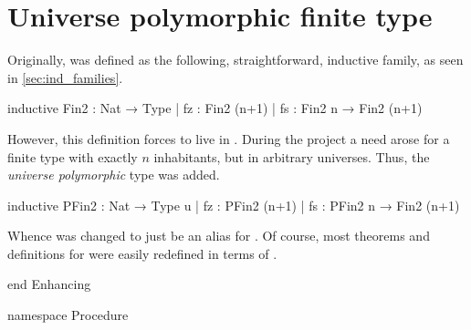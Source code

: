 \section{Universe polymorphic finite type}
\label{sec:enhance:pfin2}
Originally,  was defined as the following, straightforward, inductive family, as seen in \cref{sec:ind_families}.
\begin{leancode}
    inductive Fin2 : Nat → Type
    | fz : Fin2 (n+1)
    | fs : Fin2 n → Fin2 (n+1)
\end{leancode}

However, this definition forces  to live in \Type.
During the project a need arose for a finite type with exactly $n$ inhabitants, but in arbitrary universes. Thus, the \emph{universe polymorphic}  type was added.
\begin{leancode}
    inductive PFin2 : Nat → Type u
    | fz : PFin2 (n+1)
    | fs : PFin2 n → Fin2 (n+1)
\end{leancode}
Whence  was changed to just be an alias for .
Of course, most theorems and definitions for  were easily redefined in terms of .





\begin{leanhidden}
    end Enhancing

    namespace Procedure
\end{leanhidden}

